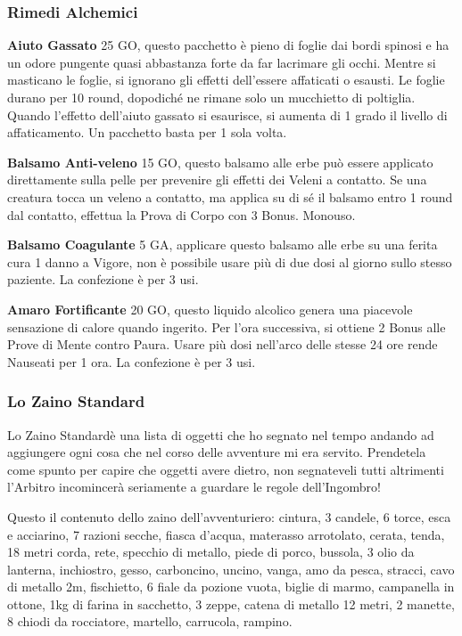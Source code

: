 \documentclass[12pt,a4paper,twoside,openany]{book}
\begin{document}
\begin{multicols}{2}
\subsubsection{Rimedi Alchemici}

\label{rimedi-alchemici}

\textbf{Aiuto Gassato} 25 GO, questo pacchetto è pieno di foglie dai bordi spinosi e ha un odore pungente quasi abbastanza forte da far lacrimare gli occhi. Mentre si masticano le foglie, si ignorano gli effetti dell'essere affaticati o esausti. Le foglie durano per 10 round, dopodiché ne rimane solo un mucchietto di poltiglia.
Quando l'effetto dell'aiuto gassato si esaurisce, si aumenta di 1 grado il livello di affaticamento. Un pacchetto basta per 1 sola volta.

\textbf{Balsamo Anti-veleno} 15 GO, questo balsamo alle erbe può essere applicato direttamente sulla pelle per prevenire gli effetti dei Veleni a contatto. Se una creatura tocca un veleno a contatto, ma applica su di sé il balsamo entro 1 round dal contatto, effettua la Prova di Corpo con 3 Bonus. Monouso.

\textbf{Balsamo Coagulante} 5 GA, applicare questo balsamo alle erbe su una ferita cura 1 danno a Vigore, non è possibile usare più di due dosi al giorno sullo stesso paziente. La confezione è per 3 usi.

\textbf{Amaro Fortificante} 20 GO, questo liquido alcolico genera una piacevole sensazione di calore quando ingerito. Per l'ora successiva, si ottiene 2 Bonus alle Prove di Mente contro Paura. Usare più dosi nell'arco delle stesse 24 ore rende Nauseati per 1 ora. La confezione è per 3 usi.


\subsubsection{Lo Zaino Standard\texorpdfstring{\huge{\textregistered}}{\textregistered}} 

Lo Zaino Standard\textregistered \space è una lista di oggetti che ho segnato nel tempo andando ad aggiungere ogni cosa che nel corso delle avventure mi era servito.
Prendetela come spunto per capire che oggetti avere dietro, non segnateveli tutti altrimenti l'Arbitro incomincerà seriamente a guardare le regole dell'Ingombro!

Questo il contenuto dello zaino dell'avventuriero: cintura, 3 candele, 6 torce, esca e acciarino, 7 razioni secche, fiasca d'acqua, materasso arrotolato, cerata, tenda, 18 metri corda, rete, specchio di metallo, piede di porco, bussola, 3 olio da lanterna, inchiostro, gesso, carboncino, uncino, vanga, amo da pesca, stracci, cavo di metallo 2m, fischietto, 6 fiale da pozione vuota, biglie di marmo, campanella in ottone, 1kg di farina in sacchetto, 3 zeppe, catena di metallo 12 metri, 2 manette, 8 chiodi da rocciatore, martello, carrucola, rampino.


\end{multicols}
\end{document}
